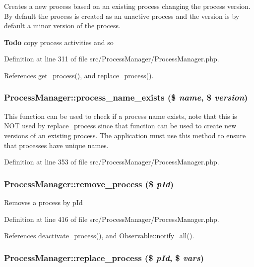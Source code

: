 Creates a new process based on an existing process changing the process version. By default the process is created as an unactive process and the version is by default a minor version of the process.

\begin{Desc}
\item[{\bf Todo}]copy process activities and so \end{Desc}


Definition at line 311 of file src/Process\-Manager/Process\-Manager.php.

References get\_\-process(), and replace\_\-process().
\subsubsection{\setlength{\rightskip}{0pt plus 5cm}Process\-Manager::process\_\-name\_\-exists (\$ {\em name}, \$ {\em version})}\label{classProcessManager_a7}


This function can be used to check if a process name exists, note that this is NOT used by replace\_\-process since that function can be used to create new versions of an existing process. The application must use this method to ensure that processes have unique names. 

Definition at line 353 of file src/Process\-Manager/Process\-Manager.php.
\subsubsection{\setlength{\rightskip}{0pt plus 5cm}Process\-Manager::remove\_\-process (\$ {\em p\-Id})}\label{classProcessManager_a11}


Removes a process by p\-Id 

Definition at line 416 of file src/Process\-Manager/Process\-Manager.php.

References deactivate\_\-process(), and Observable::notify\_\-all().
\subsubsection{\setlength{\rightskip}{0pt plus 5cm}Process\-Manager::replace\_\-process (\$ {\em p\-Id}, \$ {\em vars})}\label{classProcessManager_a12}


